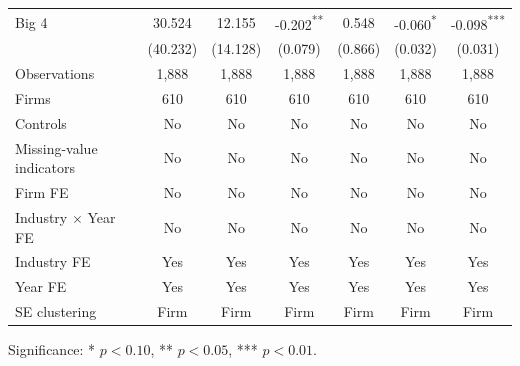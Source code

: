 \documentclass[10pt]{article}
\newcommand{\sym}[1]{\textsuperscript{#1}}
\begin{document}
\begin{minipage}{19cm}
\begin{center}
\begin{tabular*}{\textwidth}{@{\extracolsep{\fill}}lcccccc@{}}
\midrule
Big 4 & 30.524 & 12.155 & -0.202\sym{**} & 0.548 & -0.060\sym{*} & -0.098\sym{***} \\
 & (40.232) & (14.128) & (0.079) & (0.866) & (0.032) & (0.031) \\
\midrule
Observations & 1,888 & 1,888 & 1,888 & 1,888 & 1,888 & 1,888 \\
Firms & 610 & 610 & 610 & 610 & 610 & 610 \\
Controls & No & No & No & No & No & No \\
Missing-value indicators & No & No & No & No & No & No \\
Firm FE & No & No & No & No & No & No \\
Industry $\times$ Year FE & No & No & No & No & No & No \\
Industry FE & Yes & Yes & Yes & Yes & Yes & Yes \\
Year FE & Yes & Yes & Yes & Yes & Yes & Yes \\
SE clustering & Firm & Firm & Firm & Firm & Firm & Firm \\
\bottomrule\end{tabular*}\end{center}
\bigskip

\par\smallskip\raggedright\fontsize{9}{11}\selectfont Significance: * $p<0.10$, ** $p<0.05$, *** $p<0.01$.
\end{minipage}
\end{document}
